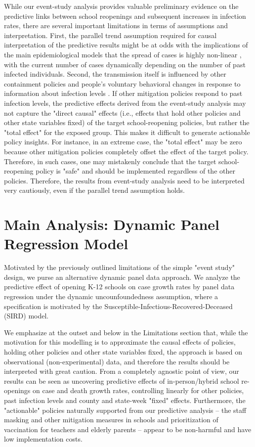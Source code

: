 \documentclass[9pt,twocolumn,twoside,lineno]{pnas-new}
\begin{document}
While our event-study analysis provides valuable preliminary evidence on the predictive links between school reopenings and subsequent increases in infection rates,  there are several important limitations in terms of assumptions and interpretation. First, the parallel trend assumption required for causal interpretation of the predictive results might be at odds with the implications of the main epidemiological models that the spread of cases is highly non-linear  \citep{Callaway2021}, with the current number of cases dynamically depending on the number of past infected individuals. Second, the transmission itself is influenced by other containment policies and people's voluntary behavioral changes in response to information about infection levels \citep{chernozhukov2021}.  If other mitigation policies respond to past infection levels, the predictive effects derived from the event-study analysis may not capture the "direct causal" effects  (i.e., effects that hold other policies and other state variables fixed) of the target school-reopening policies, but rather the "total effect" for the exposed group. This makes it difficult to generate actionable policy insights. For instance, in an extreme case, the "total effect" may be zero because other mitigation policies completely offset the effect of the target policy. Therefore, in such cases, one may mistakenly conclude that the target school-reopening policy is "safe" and should be implemented regardless of the other policies. Therefore, the results from event-study analysis need to be interpreted very cautiously, even if the parallel trend assumption holds.  
 
\section*{Main Analysis: Dynamic Panel Regression Model}
Motivated by the previously outlined limitations of the simple "event study" design, we purse an alternative dynamic panel data approach.  We analyze the predictive effect of  opening K-12 schools on case growth rates by panel data regression under the dynamic uncounfoundedness assumption, where a specification is motivated by the Susceptible-Infectious-Recovered-Deceased (SIRD) model.  

We emphasize at the outset and below in the Limitations section that, while the motivation for this modelling is to approximate the causal effects of policies, holding other policies and other state variables fixed, the approach is based on observational (non-experimental) data, and therefore the results should be interpreted with great caution. From a completely agnostic point of view, our results can be seen as uncovering predictive effects of in-person/hybrid school re-openings on case and death growth rates, controlling linearly for other policies, past infection levels and county and state-week "fixed" effects. Furthermore, the "actionable" policies naturally supported from our predictive analysis -- the staff masking and other mitigation measures in schools and prioritization of vaccination for teachers and elderly parents --  appear to be non-harmful and have low implementation costs.
\end{document}
